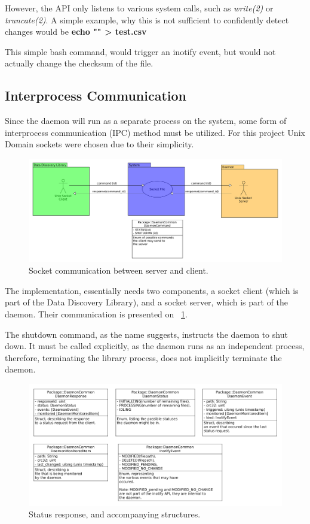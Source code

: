 However, the API only listens to various system calls, such as \textit{write(2)} or \textit{truncate(2)}.
A simple example, why this is not sufficient to confidently detect changes would be \textbf{echo "" > test.csv}

This simple bash command, would trigger an inotify event, but would not actually change the checksum of the file.

\subsection{Interprocess Communication}
Since the daemon will run as a separate process on the system, some form of interprocess communication (IPC) method
must be utilized.
For this project Unix Domain sockets were chosen due to their simplicity.

\begin{figure}[H]
    \centering
    \includegraphics[width=12cm]{figures/daemon/socket_communication}
    \caption{Socket communication between server and client.}
    \label{fig:daemon_fig_1}
\end{figure}


The implementation, essentially needs two components, a socket client (which is part of the Data Discovery Library),
and a socket server, which is part of the daemon.
Their communication is presented on ~\ref{fig:daemon_fig_1}.

The shutdown command, as the name suggests, instructs the daemon to shut down.
It must be called explicitly, as the daemon runs as an independent process, therefore,
terminating the library process, does not implicitly terminate the daemon.

\begin{figure}[H]
    \centering
    \includegraphics[width=12cm]{figures/daemon/daemon_response}
    \caption{Status response, and accompanying structures.}
    \label{fig:daemon_fig_2}
\end{figure}


